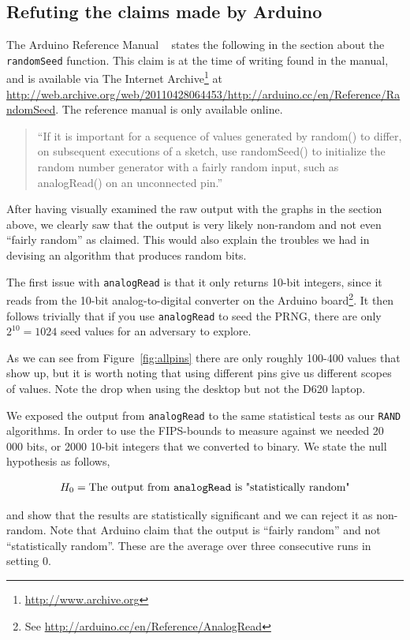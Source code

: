 \documentclass[a4paper]{article}           %
\begin{document}
\subsection{Refuting the claims made by Arduino}
\label{sec:refuting}


The Arduino Reference Manual ~\cite{ardref} states the following in the section about the \texttt{randomSeed} function. This claim is at the time of writing found in the manual, and is available via The Internet Archive\footnote{\url{http://www.archive.org}} at \url{http://web.archive.org/web/20110428064453/http://arduino.cc/en/Reference/RandomSeed}. The reference manual is only available online. 

\begin{quote}
``If it is important for a sequence of values generated by random() to differ, on subsequent executions of a sketch, use randomSeed() to initialize the random number generator with a fairly random input, such as analogRead() on an unconnected pin.''
\end{quote}

After having visually examined the raw output with the graphs in the section above, we clearly saw that the output is very likely non-random and not even ``fairly random'' as claimed. This would also explain the troubles we had in devising an algorithm that produces random bits. 

The first issue with \texttt{analogRead} is that it only returns 10-bit integers, since it reads from the 10-bit analog-to-digital converter on the Arduino board\footnote{See \url{http://arduino.cc/en/Reference/AnalogRead}}. It then follows trivially that if you use \texttt{analogRead} to seed the PRNG, there are only $2^{10} = 1024$ seed values for an adversary to explore. 

As we can see from Figure~\ref{fig:allpins} there are only roughly 100-400 values that show up, but it is worth noting that using different pins give us different scopes of values. Note the drop when using the desktop but not the D620 laptop. 

We exposed the output from \texttt{analogRead} to the same statistical tests as our \texttt{RAND} algorithms. In order to use the FIPS-bounds to measure against we needed 20 000 bits, or 2000 10-bit integers that we converted to binary. We state the null hypothesis as follows, 

\[
H_0 = \text{The output from \texttt{analogRead} is "statistically random"}
\]

and show that the results are statistically significant and we can reject it as non-random. Note that Arduino claim that the output is ``fairly random'' and not ``statistically random''. These are the average over three consecutive runs in setting 0. 
\end{document}

